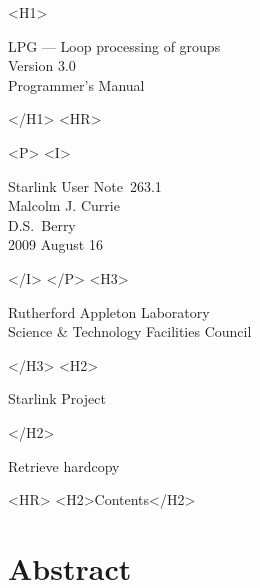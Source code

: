 \documentclass[twoside,11pt]{article}
\newcommand{\stardoccategory}  {Starlink User Note}
\newcommand{\stardocsource}    {sun\stardocnumber}
\newcommand{\stardocnumber}    {263.1}
\newcommand{\stardocauthors}   {Malcolm J. Currie\\D.S.\ Berry}
\newcommand{\stardocdate}      {2009 August 16}
\newcommand{\stardoctitle}     {LPG --- Loop processing of groups}
\newcommand{\stardocversion}   {Version 3.0}
\newcommand{\stardocmanual}    {Programmer's Manual}
\newcommand{\htmladdnormallink}[2]{#1}
\newcommand{\htmladdimg}[1]{}
\newcommand{\htmlref}[2]{#1}
\newcommand{\htmladdtonavigation}[1]{}
\newcommand{\xlabel}[1]{}
\renewcommand{\_}{\texttt{\symbol{95}}}
\begin{document}
\begin{htmlonly}
   \xlabel{}
   \begin{rawhtml} <H1> \end{rawhtml}
      \stardoctitle\\
      \stardocversion\\
      \stardocmanual
   \begin{rawhtml} </H1> <HR> \end{rawhtml}


   \begin{rawhtml} <P> <I> \end{rawhtml}
   \stardoccategory\ \stardocnumber \\
   \stardocauthors \\
   \stardocdate
   \begin{rawhtml} </I> </P> <H3> \end{rawhtml}
      \htmladdnormallink{Rutherford Appleton Laboratory}
                        {http://www.scitech.ac.uk} \\
      \htmladdnormallink{Science \& Technology Facilities Council}
                        {http://www.scitech.ac.uk} \\
   \begin{rawhtml} </H3> <H2> \end{rawhtml}
      \htmladdnormallink{Starlink Project}{http://www.starlink.ac.uk/}
   \begin{rawhtml} </H2> \end{rawhtml}
   \htmladdnormallink{\htmladdimg{source.gif} Retrieve hardcopy}
      {http://www.starlink.ac.uk/cgi-bin/hcserver?\stardocsource}\\

  \label{stardoccontents}
  \begin{rawhtml}
    <HR>
    <H2>Contents</H2>
  \end{rawhtml}
  \htmladdtonavigation{\htmlref{\htmladdimg{contents_motif.gif}}
        {stardoccontents}}

  \section{\xlabel{abstract}Abstract}
\end{htmlonly}
\end{document}
